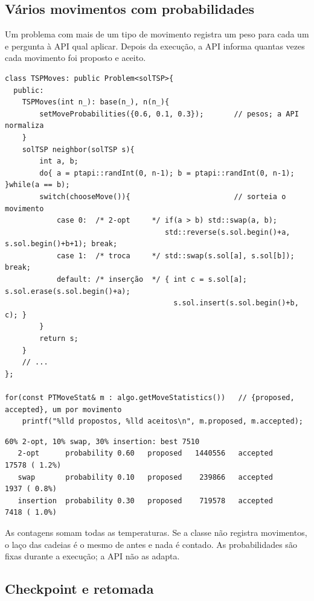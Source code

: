 \documentclass[10pt,a4paper]{article}
\begin{document}
\subsection{Vários movimentos com probabilidades}

Um problema com mais de um tipo de movimento registra um peso para cada um e pergunta à API qual aplicar. Depois da execução, a API informa quantas vezes cada movimento foi proposto e aceito.

\begin{lstlisting}[style=cpp]
class TSPMoves: public Problem<solTSP>{
  public:
    TSPMoves(int n_): base(n_), n(n_){
        setMoveProbabilities({0.6, 0.1, 0.3});       // pesos; a API normaliza
    }
    solTSP neighbor(solTSP s){
        int a, b;
        do{ a = ptapi::randInt(0, n-1); b = ptapi::randInt(0, n-1); }while(a == b);
        switch(chooseMove()){                        // sorteia o movimento
            case 0:  /* 2-opt     */ if(a > b) std::swap(a, b);
                                     std::reverse(s.sol.begin()+a, s.sol.begin()+b+1); break;
            case 1:  /* troca     */ std::swap(s.sol[a], s.sol[b]); break;
            default: /* inserção  */ { int c = s.sol[a]; s.sol.erase(s.sol.begin()+a);
                                       s.sol.insert(s.sol.begin()+b, c); }
        }
        return s;
    }
    // ...
};

for(const PTMoveStat& m : algo.getMoveStatistics())   // {proposed, accepted}, um por movimento
    printf("%lld propostos, %lld aceitos\n", m.proposed, m.accepted);
\end{lstlisting}

\begin{lstlisting}[style=saida]
60% 2-opt, 10% swap, 30% insertion: best 7510
   2-opt      probability 0.60   proposed   1440556   accepted    17578 ( 1.2%)
   swap       probability 0.10   proposed    239866   accepted     1937 ( 0.8%)
   insertion  probability 0.30   proposed    719578   accepted     7418 ( 1.0%)
\end{lstlisting}

As contagens somam todas as temperaturas. Se a classe não registra movimentos, o laço das cadeias é o mesmo de antes e nada é contado. As probabilidades são fixas durante a execução; a API não as adapta.

\subsection{Checkpoint e retomada}
\end{document}
